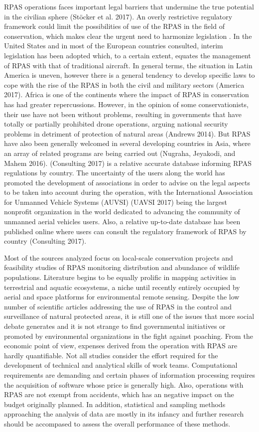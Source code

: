 \documentclass[]{interact}
\theoremstyle{plain}%
\theoremstyle{definition}
\theoremstyle{remark}
\begin{document}
RPAS operations faces important legal barriers that undermine the true
potential in the civilian sphere (Stöcker et al. 2017). An overly
restrictive regulatory framework could limit the possibilities of use of
the RPAS in the field of conservation, which makes clear the urgent need
to harmonize legislation . In the United States and in most of the
European countries consulted, interim legislation has been adopted
which, to a certain extent, equates the management of RPAS with that of
traditional aircraft. In general terms, the situation in Latin America
is uneven, however there is a general tendency to develop specific laws
to cope with the rise of the RPAS in both the civil and military sectors
(America 2017). Africa is one of the continents where the impact of RPAS
in conservation has had greater repercussions. However, in the opinion
of some conservationists, their use have not been without problems,
resulting in governments that have totally or partially prohibited drone
operations, arguing national security problems in detriment of
protection of natural areas (Andrews 2014). But RPAS have also been
generally welcomed in several developing countries in Asia, where an
array of related programs are being carried out (Nugraha, Jeyakodi, and
Mahem 2016). (Consulting 2017) is a relative accurate database informing
RPAS regulations by country. The uncertainty of the users along the
world has promoted the development of associations in order to advise on
the legal aspects to be taken into account during the operation, with
the International Association for Unmanned Vehicle Systems (AUVSI)
(UAVSI 2017) being the largest nonprofit organization in the world
dedicated to advancing the community of unmanned aerial vehicles users.
Also, a relative up-to-date database has been published online where
users can consult the regulatory framework of RPAS by country
(Consulting 2017).

Most of the sources analyzed focus on local-scale conservation projects
and feasibility studies of RPAS monitoring distribution and abundance of
wildlife populations. Literature begins to be equally prolific in
mapping activities in terrestrial and aquatic ecosystems, a niche until
recently entirely occupied by aerial and space platforms for
environmental remote sensing. Despite the low number of scientific
articles addressing the use of RPAS in the control and surveillance of
natural protected areas, it is still one of the issues that more social
debate generates and it is not strange to find governmental initiatives
or promoted by environmental organizations in the fight against
poaching. From the economic point of view, expenses derived from the
operation with RPAS are hardly quantifiable. Not all studies consider
the effort required for the development of technical and analytical
skills of work teams. Computational requirements are demanding and
certain phases of information processing requires the acquisition of
software whose price is generally high. Also, operations with RPAS are
not exempt from accidents, which has an negative impact on the budget
originally planned. In addition, statistical and sampling methods
approaching the analysis of data are mostly in its infancy and further
research should be accompased to assess the overall performance of these
methods.
\end{document}
